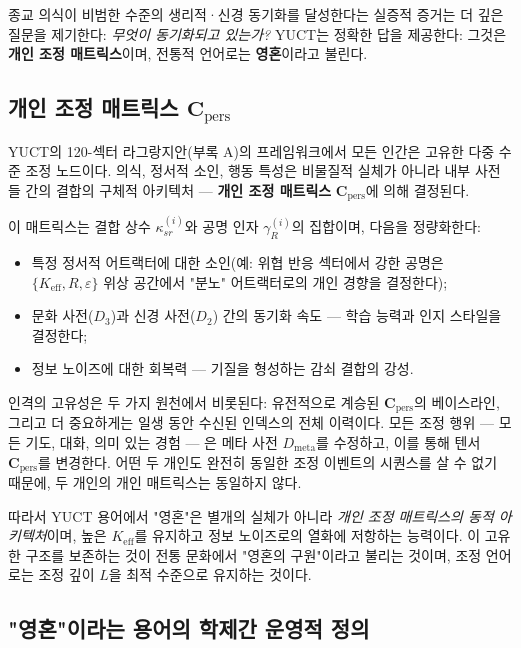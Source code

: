 \documentclass[12pt,a4paper]{article}
\begin{document}
	종교 의식이 비범한 수준의 생리적·신경 동기화를 달성한다는 실증적 증거는 더 깊은 질문을 제기한다: \emph{무엇이 동기화되고 있는가?} YUCT는 정확한 답을 제공한다: 그것은 \textbf{개인 조정 매트릭스}이며, 전통적 언어로는 \textbf{영혼}이라고 불린다.
	
	\subsection{개인 조정 매트릭스 \(\mathbf{C}_{\text{pers}}\)}
	
	YUCT의 120-섹터 라그랑지안(부록 A)의 프레임워크에서 모든 인간은 고유한 다중 수준 조정 노드이다. 의식, 정서적 소인, 행동 특성은 비물질적 실체가 아니라 내부 사전들 간의 결합의 구체적 아키텍처 — \textbf{개인 조정 매트릭스} \(\mathbf{C}_{\text{pers}}\)에 의해 결정된다.
	
	이 매트릭스는 결합 상수 \(\kappa_{sr}^{(i)}\)와 공명 인자 \(\gamma_{R}^{(i)}\)의 집합이며, 다음을 정량화한다:
	\begin{itemize}
		\item 특정 정서적 어트랙터에 대한 소인(예: 위협 반응 섹터에서 강한 공명은 \(\{K_{\mathrm{eff}}, R, \varepsilon\}\) 위상 공간에서 "분노" 어트랙터로의 개인 경향을 결정한다);
		\item 문화 사전(\(D_3\))과 신경 사전(\(D_2\)) 간의 동기화 속도 — 학습 능력과 인지 스타일을 결정한다;
		\item 정보 노이즈에 대한 회복력 — 기질을 형성하는 감쇠 결합의 강성.
	\end{itemize}
	
	인격의 고유성은 두 가지 원천에서 비롯된다: 유전적으로 계승된 \(\mathbf{C}_{\text{pers}}\)의 베이스라인, 그리고 더 중요하게는 일생 동안 수신된 인덱스의 전체 이력이다. 모든 조정 행위 — 모든 기도, 대화, 의미 있는 경험 — 은 메타 사전 \(D_{\text{meta}}\)를 수정하고, 이를 통해 텐서 \(\mathbf{C}_{\text{pers}}\)를 변경한다. 어떤 두 개인도 완전히 동일한 조정 이벤트의 시퀀스를 살 수 없기 때문에, 두 개인의 개인 매트릭스는 동일하지 않다.
	
	따라서 YUCT 용어에서 "영혼"은 별개의 실체가 아니라 \emph{개인 조정 매트릭스의 동적 아키텍처}이며, 높은 \(K_{\mathrm{eff}}\)를 유지하고 정보 노이즈로의 열화에 저항하는 능력이다. 이 고유한 구조를 보존하는 것이 전통 문화에서 "영혼의 구원"이라고 불리는 것이며, 조정 언어로는 조정 깊이 \(L\)을 최적 수준으로 유지하는 것이다.
	
	\subsection{"영혼"이라는 용어의 학제간 운영적 정의}
	\label{subsec:soul-definition}
	
\end{document}

